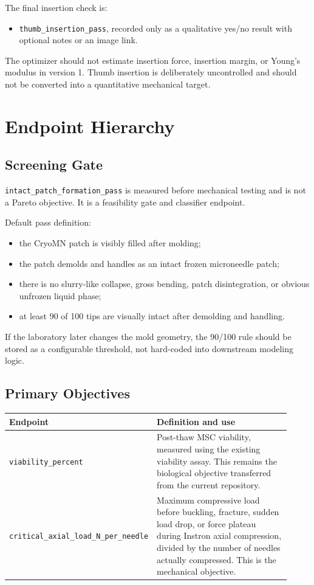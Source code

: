 \documentclass[11pt]{article}
\newcommand{\metric}[1]{\texttt{#1}}
\begin{document}
The final insertion check is:
\begin{itemize}
    \item \metric{thumb\_insertion\_pass}, recorded only as a qualitative yes/no
    result with optional notes or an image link.
\end{itemize}

The optimizer should not estimate insertion force, insertion margin, or Young's
modulus in version 1. Thumb insertion is deliberately uncontrolled and should not be
converted into a quantitative mechanical target.

\section{Endpoint Hierarchy}

\subsection{Screening Gate}

\metric{intact\_patch\_formation\_pass} is measured before mechanical testing and is
not a Pareto objective. It is a feasibility gate and classifier endpoint.

Default pass definition:
\begin{itemize}
    \item the CryoMN patch is visibly filled after molding;
    \item the patch demolds and handles as an intact frozen microneedle patch;
    \item there is no slurry-like collapse, gross bending, patch disintegration, or
    obvious unfrozen liquid phase;
    \item at least 90 of 100 tips are visually intact after demolding and handling.
\end{itemize}

If the laboratory later changes the mold geometry, the 90/100 rule should be stored as
a configurable threshold, not hard-coded into downstream modeling logic.

\subsection{Primary Objectives}

\begin{longtable}{@{}p{0.38\linewidth}p{0.54\linewidth}@{}}
\toprule
\textbf{Endpoint} & \textbf{Definition and use} \\
\midrule
\metric{viability\_percent} &
Post-thaw MSC viability, measured using the existing viability assay. This remains
the biological objective transferred from the current repository. \\
\metric{critical\_axial\_load\_N\_per\_needle} &
Maximum compressive load before buckling, fracture, sudden load drop, or force
plateau during Instron axial compression, divided by the number of needles actually
compressed. This is the mechanical objective. \\
\bottomrule
\end{longtable}
\end{document}
